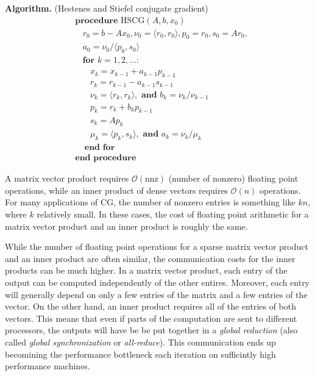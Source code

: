 \documentclass[10pt]{article}
\begin{document}
\textbf{Algorithm.} (Hestenes and Stiefel conjugate gradient)
\begin{align*}
&\textbf{procedure}\text{ HSCG}( A,b,x_0 ) 
\\[-.4em]&~~~~r_0 = b-Ax_0, \nu_0 = \langle r_0,r_0 \rangle, p_0 = r_0, s_0 = Ar_0, 
\\[-.4em]&~~~~a_0 = \nu_0 / \langle p_0,s_0 \rangle
\\[-.4em]&~~~~\textbf{for } k=1,2,\ldots \textbf{:} 
\\[-.4em]&~~~~~~~~x_k = x_{k-1} + a_{k-1} p_{k-1} 
\\[-.4em]&~~~~~~~~r_k = r_{k-1} - a_{k-1} s_{k-1} 
\\[-.4em]&~~~~~~~~\nu_{k} = \langle r_k,r_k \rangle, \textbf{ and } b_k = \nu_k / \nu_{k-1}
\\[-.4em]&~~~~~~~~p_k = r_k + b_k p_{k-1}
\\[-.4em]&~~~~~~~~s_k = A p_k
\\[-.4em]&~~~~~~~~\mu_k = \langle p_k,s_k \rangle, \textbf{ and } a_k = \nu_k / \mu_k
\\[-.4em]&~~~~~\textbf{end for}
\\[-.4em]&\textbf{end procedure}
\end{align*}

A matrix vector product requires \(\mathcal{O}(\text{nnz})\) (number of nonzero) floating point operations, while an inner product of dense vectors requires \(\mathcal{O}(n)\) operations.
For many applications of CG, the number of nonzero entries is something like \(kn\), where \(k\) relatively small.
In these cases, the cost of floating point arithmetic for a matrix vector product and an inner product is roughly the same.

While the number of floating point operations for a sparse matrix vector product and an inner product are often similar, the communication costs for the inner products can be much higher.
In a matrix vector product, each entry of the output can be computed independently of the other entires. Moreover, each entry will generally depend on only a few entries of the matrix and a few entries of the vector.
On the other hand, an inner product requires all of the entries of both vectors.
This means that even if parts of the computation are sent to different processors, the outputs will have be be put together in a \emph{global reduction} (also called \emph{global synchronization} or \emph{all-reduce}).
This communication ends up becomining the performance bottleneck each iteration on sufficintly high performance machines.
\end{document}
